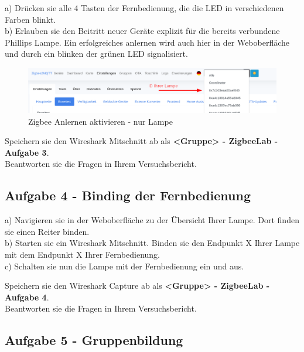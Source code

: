 a) Drücken sie alle 4 Tasten der Fernbedienung, die die LED in verschiedenen Farben blinkt.\\
b) Erlauben sie den Beitritt neuer Geräte explizit für die bereits verbundene Phillips Lampe.
Ein erfolgreiches anlernen wird auch hier in der Weboberfläche und durch ein blinken der grünen LED signalisiert. 

\begin{figure}[H]
    \centering
    \includegraphics[width=1\textwidth]{media/Z2M-Anlernen-Lampe.png}
    \caption{Zigbee Anlernen aktivieren - nur Lampe}
\end{figure}

\begin{Aufgabe}
    Speichern sie den Wireshark Mitschnitt ab als \textbf{\grqq <Gruppe> - ZigbeeLab - Aufgabe 3\grqq{}}. \\
    Beantworten sie die Fragen in Ihrem Versuchsbericht.
\end{Aufgabe}

\subsection{Aufgabe 4 - Binding der Fernbedienung}

a) Navigieren sie in der Weboberfläche zu der Übersicht Ihrer Lampe. Dort finden sie einen Reiter \grqq binden\grqq{}. \\
b) Starten sie ein Wireshark Mitschnitt. Binden sie den Endpunkt X Ihrer Lampe mit dem Endpunkt X Ihrer Fernbedienung. \\
c) Schalten sie nun die Lampe mit der Fernbedienung ein und aus. 

\begin{Hinweis}
    Speichern sie den Wireshark Capture ab als \textbf{\grqq <Gruppe> - ZigbeeLab - Aufgabe 4\grqq{}}. \\
    Beantworten sie die Fragen in Ihrem Versuchsbericht.
\end{Hinweis}



\subsection{Aufgabe 5 - Gruppenbildung}

